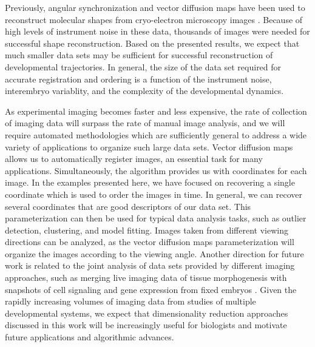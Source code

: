 \documentclass{pnastwo}
\begin{document}
\begin{article}
Previously, angular synchronization and vector diffusion maps have been used to reconstruct molecular shapes from cryo-electron microscopy images \cite{singer2012vector, zhao2014rotationally, singer2011viewing}.
%
Because of high levels of instrument noise in these data, thousands of images were needed for successful shape reconstruction. 
%
Based on the presented results, we expect that much smaller data sets may be sufficient for successful reconstruction of developmental trajectories.
%
In general, the size of the data set required for accurate registration and ordering is a function of the instrument noise, interembryo variablity, and the complexity of the developmental dynamics.
%
 
As experimental imaging becomes faster and less expensive, the rate of collection of imaging data will surpass the rate of manual image analysis,
and we will require automated methodologies which are sufficiently general to address a wide variety of applications to organize such large data sets.
%
Vector diffusion maps allows us to automatically register images, an essential task for many applications.
%
Simultaneously, the algorithm provides us with coordinates for each image.
%
In the examples presented here, we have focused on recovering a single coordinate which is used to order the images in time.
%
In general, we can recover several coordinates that are good descriptors of our data set.
%
This parameterization can then be used for typical data analysis tasks, such as outlier detection, clustering, and model fitting. 
%
Images taken from different viewing directions can be analyzed, as the vector diffusion maps parameterization will organize the images according to the viewing angle.
%
Another direction for future work is related to the joint analysis of data sets provided by different imaging approaches, such as merging live imaging data of tissue morphogenesis with snapshots of cell signaling and gene expression from fixed embryos \cite{krzic2012multiview, ichikawa2014live, rubel2010coupling}.  
%
Given the rapidly increasing volumes of imaging data from studies of multiple developmental systems, we expect that dimensionality reduction approaches discussed in this work will be increasingly useful for biologists and motivate future applications and algorithmic advances. 
  


\end{article}
\end{document}
